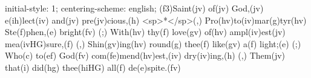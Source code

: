 initial-style: 1;
centering-scheme: english;
(f3)Saint(jv) of(jv) God,(jv) e(ih)lect(iv) and(jv) pre(jv)cious,(h) <sp>*</sp>(,)
Pro(hv)to(iv)mar(g)tyr(hv) Ste(f)phen,(e) bright(fv) (;)
With(hv) thy(f) love(gv) of(hv) ampl(iv)est(jv) mea(ivHG)sure,(f) (,)
Shin(gv)ing(hv) round(g) thee(f) like(gv) a(f) light;(e) (;)
Who(c) to(ef) God(fv) com(fe)mend(hv)est,(iv) dry(iv)ing,(h) (,)
Them(jv) that(i) did(hg) thee(hiHG) all(f) de(e)spite.(fv)
